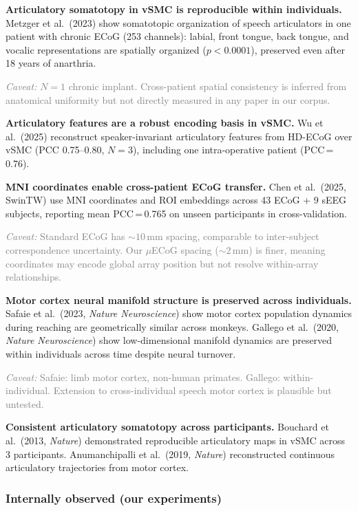 \documentclass[11pt,letterpaper]{article}
\newcommand{\caveat}[1]{\par\smallskip\noindent\textcolor{gray}{\textit{Caveat:} #1}\smallskip}
\begin{document}
\textbf{Articulatory somatotopy in vSMC is reproducible within individuals.} Metzger et al.\ (2023) show somatotopic organization of speech articulators in one patient with chronic ECoG (253 channels): labial, front tongue, back tongue, and vocalic representations are spatially organized ($p{<}0.0001$), preserved even after 18 years of anarthria.

\caveat{$N{=}1$ chronic implant. Cross-patient spatial consistency is inferred from anatomical uniformity but not directly measured in any paper in our corpus.}

\textbf{Articulatory features are a robust encoding basis in vSMC.} Wu et al.\ (2025) reconstruct speaker-invariant articulatory features from HD-ECoG over vSMC (PCC 0.75--0.80, $N{=}3$), including one intra-operative patient (PCC\,=\,0.76).

\textbf{MNI coordinates enable cross-patient ECoG transfer.} Chen et al.\ (2025, SwinTW) use MNI coordinates and ROI embeddings across 43 ECoG + 9 sEEG subjects, reporting mean PCC\,=\,0.765 on unseen participants in cross-validation.

\caveat{Standard ECoG has ${\sim}10$\,mm spacing, comparable to inter-subject correspondence uncertainty. Our $\mu$ECoG spacing (${\sim}2$\,mm) is finer, meaning coordinates may encode global array position but not resolve within-array relationships.}

\textbf{Motor cortex neural manifold structure is preserved across individuals.} Safaie et al.\ (2023, \textit{Nature Neuroscience}) show motor cortex population dynamics during reaching are geometrically similar across monkeys. Gallego et al.\ (2020, \textit{Nature Neuroscience}) show low-dimensional manifold dynamics are preserved within individuals across time despite neural turnover.

\caveat{Safaie: limb motor cortex, non-human primates. Gallego: within-individual. Extension to cross-individual speech motor cortex is plausible but untested.}

\textbf{Consistent articulatory somatotopy across participants.} Bouchard et al.\ (2013, \textit{Nature}) demonstrated reproducible articulatory maps in vSMC across 3 participants. Anumanchipalli et al.\ (2019, \textit{Nature}) reconstructed continuous articulatory trajectories from motor cortex.

\subsubsection{Internally observed (our experiments)}
\end{document}
